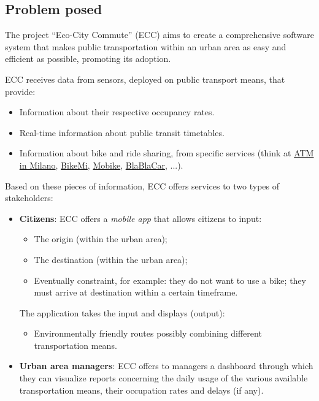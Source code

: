\documentclass[a4paper]{article}
\newcommand{\dquotes}[1]{``#1''}
\newcommand{\highspace}{\vspace{1.2em}\noindent}
\begin{document}
    \subsection*{Problem posed}

    The project \dquotes{Eco-City Commute} (ECC) aims to create a comprehensive software system that makes public transportation within an urban area as easy and efficient as possible, promoting its adoption.

    \highspace
    ECC receives data from sensors, deployed on public transport means, that provide:
    \begin{itemize}
        \item Information about their respective occupancy rates.
        \item Real-time information about public transit timetables.
        \item Information about bike and ride sharing, from specific services (think at \href{https://www.atm.it/it/Pagine/default.aspx}{ATM in Milano}, \href{https://bikemi.com/en}{BikeMi}, \href{https://en.wikipedia.org/wiki/Mobike}{Mobike}, \href{https://www.blablacar.co.uk/}{BlaBlaCar}, ...).
    \end{itemize}
    Based on these pieces of information, ECC offers services to two types of stakeholders:
    \begin{itemize}
        \item \textbf{Citizens}: ECC offers a \emph{mobile app} that allows citizens to input:
        \begin{itemize}
            \item The origin (within the urban area);
            \item The destination (within the urban area);
            \item Eventually constraint, for example: they do not want to use a bike; they must arrive at destination within a certain timeframe.
        \end{itemize}
        The application takes the input and displays (output):
        \begin{itemize}
            \item Environmentally friendly routes possibly combining different transportation means.
        \end{itemize}

        \item \textbf{Urban area managers}: ECC offers to managers a dashboard through which they can visualize reports concerning the daily usage of the various available transportation means, their occupation rates and delays (if any).
    \end{itemize}
\end{document}
